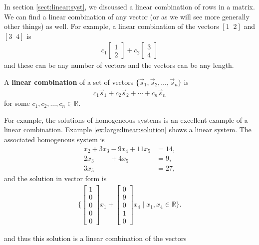 In section \ref{sect:linear:syst}, we discussed a linear combination of rows in a matrix.  We can find a linear combination of any vector (or as we will see more generally other things) as well.  For example, a linear combination of the vectors $[1\;\;2]$ and $[3\;\;4]$ is 
%
\begin{align*}
c_1 \begin{bmatrix}
1 \\2 
\end{bmatrix} + c_2 \begin{bmatrix}
3 \\4 
\end{bmatrix}
\end{align*}
and these can be any number of vectors and the vectors can be any length.  

\begin{definition}
A \textbf{linear combination} of a set of vectors $\{ \vec{s}_1, \vec{s}_2, \ldots, \vec{s}_n \}$ is 
%
\begin{align*}
c_1 \vec{s}_1+ c_2 \vec{s}_2 +  \cdots + c_n \vec{s}_n
\end{align*}
for some $c_1, c_2, \ldots, c_n \in \mathbb{R}$.  
\end{definition}

For example, the solutions of homogeneous systems is an excellent example of a linear combination.  Example \ref{ex:large:linear:solution} shows a linear system.  The associated homogenous system is
 \begin{align*}
x_2 + 3x_3 -9 x_4 + 11 x_5 & = 14, \\
2x_3 \phantom{-9x_4} + 4x_5 & = 9, \\
3x_5 & = 27, 
\end{align*}
and the solution in vector form is
\begin{align*}
\{ \begin{bmatrix}
1 \\ 0 \\ 0 \\ 0 \\0
\end{bmatrix} x_1 + 
\begin{bmatrix}
0 \\ 9 \\ 0 \\ 1 \\ 0
\end{bmatrix} x_4 \;  | \; x_1, x_4 \in \mathbb{R} \}.
\end{align*}

and thus this solution is a linear combination of the vectors 


